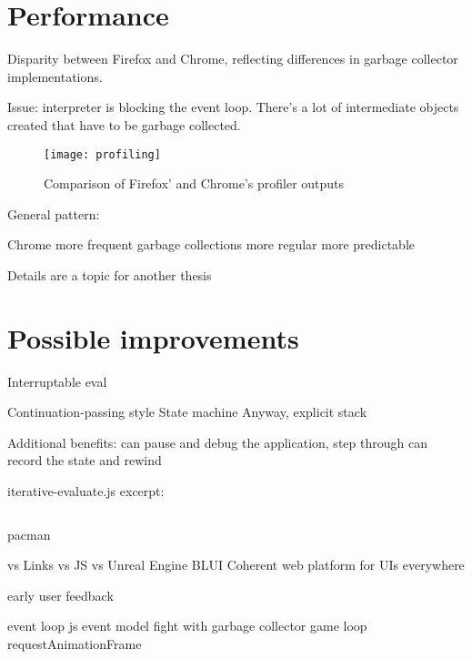 \section{Performance}

Disparity between Firefox and Chrome, reflecting differences in garbage collector implementations.

Issue: interpreter is blocking the event loop.
There's a lot of intermediate objects created that have to be garbage collected.

\begin{figure}[h!]
	\centering
	\texttt{[image: profiling]}
	\caption{Comparison of Firefox' and Chrome's profiler outputs}
	\label{fig:profiling}
\end{figure}
General pattern:

Chrome more frequent garbage collections
more regular
more predictable

Details are a topic for another thesis

\section{Possible improvements}
Interruptable eval

Continuation-passing style
State machine
Anyway, explicit stack

Additional benefits:
	can pause and debug the application, step through
	can record the state and rewind
	
iterative-evaluate.js excerpt:
\begin{lstlisting}
\end{lstlisting}


pacman

vs Links
vs JS
vs Unreal Engine
    BLUI
    Coherent
        web platform for UIs everywhere

early user feedback

event loop
js event model
fight with garbage collector
game loop
requestAnimationFrame

